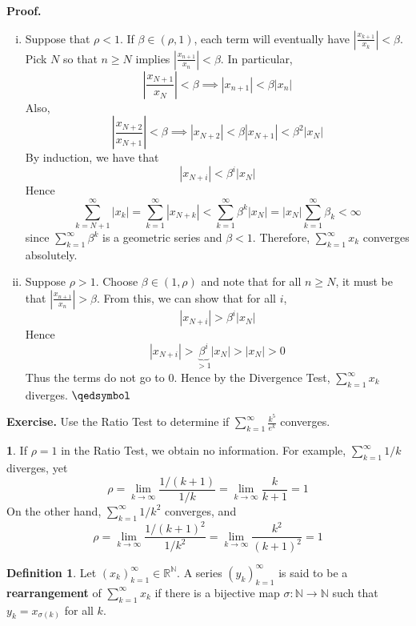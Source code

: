 \documentclass[11pt]{article}
\theoremstyle{definition}
\newtheorem{defn}[thm]{Definition}
\newtheorem{none}[thm]{}
\newcommand{\mbN}{\ensuremath{\mathbb{N}}}
\newcommand{\mbR}{\ensuremath{\mathbb{R}}}
\begin{document}
\textbf{Proof.} 
\begin{enumerate}[(i)] \vspace{-0.2cm}

\item Suppose that $\rho < 1$. If $\beta \in (\rho, 1)$, each term will eventually have $\left| \frac{x_{k+1}}{x_k} \right| < \beta$. 
Pick $N$ so that $n \geq N$ implies $\left| \frac{x_{n+1}}{x_n} \right| < \beta$. In particular,
$$\left| \frac{x_{N+1}}{x_N} \right| < \beta \implies |x_{n+1}| < \beta|x_n|$$
Also,
$$\left| \frac{x_{N+2}}{x_{N+1}} \right| < \beta \implies |x_{N+2}| < \beta|x_{N+1}| < \beta^2|x_N|$$
By induction, we have that
$$|x_{N+i}| < \beta^i |x_N|$$
Hence
$$\sum_{k=N+1}^\infty |x_k| = \sum_{k=1}^\infty |x_{N+k}| < \sum_{k=1}^\infty \beta^k |x_N| = |x_N| \sum_{k=1}^\infty \beta_k < \infty$$
since $\sum_{k=1}^\infty \beta^k$ is a geometric series and $\beta < 1$. Therefore, $\sum_{k=1}^\infty x_k$ converges absolutely. 

\item Suppose $\rho > 1$. Choose $\beta \in (1, \rho)$ and note that for all $n \geq N$, it must be that $\left| \frac{x_{n+1}}{x_n} \right| > \beta$. From this, we can show that for all $i$,
$$|x_{N+i}| > \beta^i|x_N|$$
Hence
$$|x_{N+i}| > \underbrace{\beta^i}_{>1} |x_N| > |x_N| > 0$$
Thus the terms do not go to 0. Hence by the Divergence Test, $\sum_{k=1}^\infty x_k$ diverges. $\qedsymbol$

\end{enumerate}

\textbf{Exercise.} Use the Ratio Test to determine if $\sum_{k=1}^\infty \frac{k^5}{e^k}$ converges.

\begin{none}
If $\rho = 1$ in the Ratio Test, we obtain no information. 
For example, $\sum_{k=1}^\infty 1/k$ diverges, yet
$$\rho = \lim_{k\to\infty} \frac{1/(k+1)}{1/k} = \lim_{k\to\infty} \frac{k}{k+1} = 1$$
On the other hand, $\sum_{k=1}^\infty 1/k^2$ converges, and
$$\rho = \lim_{k\to\infty} \frac{1/(k+1)^2}{1/k^2} = \lim_{k\to\infty} \frac{k^2}{(k+1)^2} = 1$$
\end{none}

\begin{defn}
Let $(x_k)_{k=1}^\infty \in \mbR^\mbN$. A series $(y_k)_{k=1}^\infty$ is said to be a \textbf{rearrangement} of $\sum_{k=1}^\infty x_k$ if there is a bijective map $\sigma : \mbN \to \mbN$ such that $y_k = x_{\sigma(k)}$ for all $k$.
\end{defn}
\end{document}

